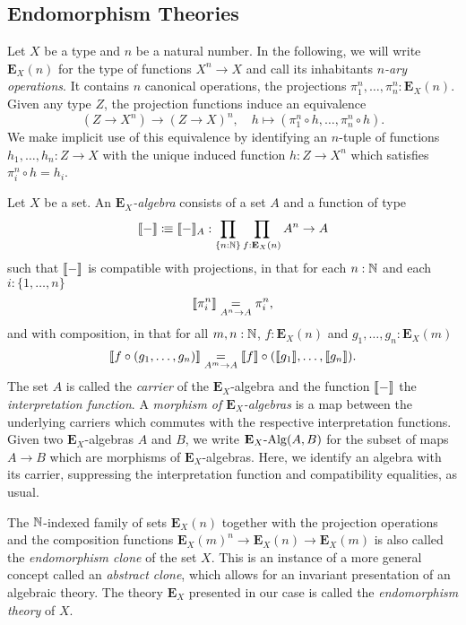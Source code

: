 {
\newcommand{\EE}{\mathbf{E}}
\newcommand{\ev}{\operatorname{\mathrm{ev}}}

\subsection{Endomorphism Theories}

Let \(X\) be a type and \(n\) be a natural number.
In the following, we will write \(\EE_X(n)\) for the type of functions \(X^n\to X\) and call its inhabitants \emph{\(n\)-ary operations}.
It contains \(n\) canonical operations, the projections \(\pi^n_1,\dots,\pi^n_n : \EE_X(n)\).
Given any type \(Z\), the projection functions induce an equivalence
\[
  (Z \to X^n) \to (Z\to X)^n, \quad h \mapsto (\pi^n_1\circ h,\dots,\pi^n_n\circ h).
\]
We make implicit use of this equivalence by identifying an \(n\)-tuple of functions \(h_1,\dots,h_n:Z\to X\) with the unique induced function \(h : Z\to X^n\) which satisfies \(\pi^n_i \circ h = h_i\).

\begin{definition}
  Let \(X\) be a set.
  An \emph{\(\EE_X\)-algebra} consists of a set \(A\) and a function of type
  \[
    \interpret{-}\colonequiv\interpret{-}_A : \prod_{\{n:\N\}}\prod_{f:\EE_X(n)} A^n \to A
  \]
  such that \(\llbracket-\rrbracket\) is compatible with projections, in that
  for each \(n:\mathbb{N}\) and each \(i : \{1,\dots,n\}\)
  \[\llbracket\pi^n_i\rrbracket \underset{A^n \to A}{=} \pi^n_i,\]
  and with composition, in that for all \(m,n:\mathbb{N}\), \(f:\EE_X(n)\) and \(g_1,\dots,g_n : \EE_X(m)\)
  \[\llbracket f\circ (g_1,\dots,g_n)\rrbracket \underset{A^m \to A}{=} \llbracket f\rrbracket\circ (\llbracket g_1\rrbracket,\dots,\llbracket g_n\rrbracket).\]
  The set \(A\) is called the \emph{carrier} of the \(\EE_X\)-algebra and the function \(\llbracket-\rrbracket\) the \emph{interpretation function}.
  A \emph{morphism of \(\EE_X\)-algebras} is a map between the underlying carriers which commutes with the respective interpretation functions.
  Given two \(\EE_X\)-algebras \(A\) and \(B\), we write \(\Alg{\EE_X}(A,B)\) for the subset of maps \(A\to B\) which are morphisms of \(\EE_X\)-algebras.
  Here, we identify an algebra with its carrier, suppressing the interpretation function and compatibility equalities, as usual.
\end{definition}

\begin{remark}
  The \(\mathbb{N}\)-indexed family of sets \(\EE_X(n)\) together with the projection operations and the composition functions \(\EE_X(m)^n \to \EE_X(n) \to \EE_X(m)\) is also called the \emph{endomorphism clone} of the set \(X\).
  This is an instance of a more general concept called an \emph{abstract clone}, which allows for an invariant presentation of an algebraic theory.
  The theory \(\EE_X\) presented in our case is called the \emph{endomorphism theory} of \(X\).
\end{remark}

}
